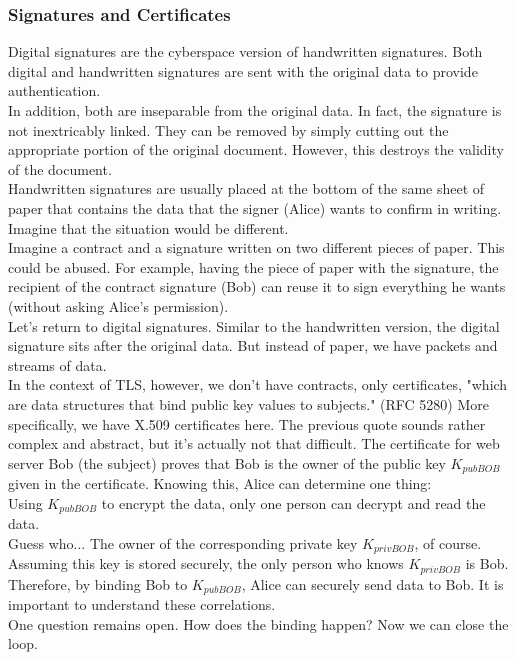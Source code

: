 \subsubsection{Signatures and Certiﬁcates}\cite{b38}
Digital signatures are the cyberspace version of handwritten signatures. Both digital and 
handwritten signatures are sent with the original data to provide authentication.
\\
In addition, both are inseparable from the original data. In fact, the signature is not 
inextricably linked. They can be removed by simply cutting out the appropriate portion of 
the original document. However, this destroys the validity of the document.
\\
Handwritten signatures are usually placed at the bottom of the same sheet of paper that 
contains the data that the signer (Alice) wants to confirm in writing. Imagine that the 
situation would be different.
\\
Imagine a contract and a signature written on two different pieces of paper. This could 
be abused. For example, having the piece of paper with the signature, the recipient of the contract
signature (Bob) can reuse it to sign everything he wants (without asking Alice's permission).
\\
Let's return to digital signatures. Similar to the handwritten version, the digital 
signature sits after the original data. But instead of paper, we have packets and streams 
of data.
\\
In the context of TLS, however, we don't have contracts, only certificates, "which are 
data structures that bind public key values to subjects." (RFC 5280) More specifically, 
we have X.509 certificates here. The previous quote sounds rather complex and abstract, 
but it's actually not that difficult. The certificate for web server Bob (the subject) 
proves that Bob is the owner of the public key $K_{pubBOB}$ given in the certificate. 
Knowing this, Alice can determine one thing:
\\
Using $K_{pubBOB}$ to encrypt the data, only one person can decrypt and read the data.
\\
Guess who... The owner of the corresponding private key $K_{privBOB}$, of course. 
Assuming this key is stored securely, the only person who knows $K_{privBOB}$ is Bob. 
Therefore, by binding Bob to $K_{pubBOB}$, Alice can securely send data to Bob. It is 
important to understand these correlations.
\\
One question remains open. How does the binding happen? Now we can close the loop. 
